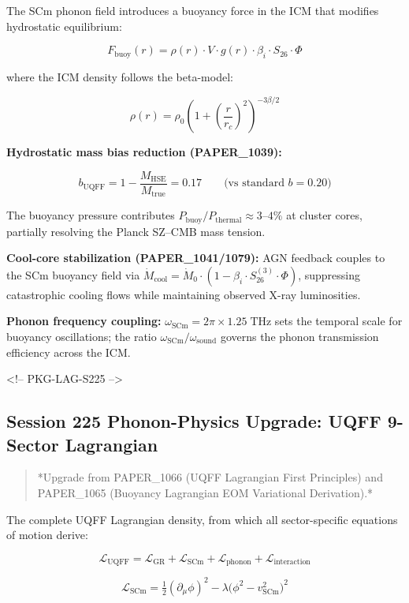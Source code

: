 \documentclass[11pt]{article}
\begin{document}
The SCm phonon field introduces a buoyancy force in the ICM that modifies hydrostatic equilibrium:

$$F_{\text{buoy}}(r) = \rho(r) \cdot V \cdot g(r) \cdot \beta_i \cdot S_{26} \cdot \Phi$$

where the ICM density follows the beta-model:

$$\rho(r) = \rho_0 \left(1 + \left(\frac{r}{r_c}\right)^2\right)^{-3\beta/2}$$

\textbf{Hydrostatic mass bias reduction (PAPER\_1039):}

$$b_{\text{UQFF}} = 1 - \frac{M_{\text{HSE}}}{M_{\text{true}}} = 0.17 \qquad \text{(vs standard } b = 0.20\text{)}$$

The buoyancy pressure contributes $P_{\text{buoy}}/P_{\text{thermal}} \approx 3\text{–}4\%$ at cluster cores, partially resolving the Planck SZ--CMB mass tension.

\textbf{Cool-core stabilization (PAPER\_1041/1079):} AGN feedback couples to the SCm buoyancy field via $\dot{M}_{\text{cool}} = \dot{M}_0 \cdot (1 - \beta_i \cdot S_{26}^{(3)} \cdot \Phi)$, suppressing catastrophic cooling flows while maintaining observed X-ray luminosities.

\textbf{Phonon frequency coupling:} $\omega_{\text{SCm}} = 2\pi \times 1.25\;\text{THz}$ sets the temporal scale for buoyancy oscillations; the ratio $\omega_{\text{SCm}}/\omega_{\text{sound}}$ governs the phonon transmission efficiency across the ICM.

<!-- PKG-LAG-S225 -->

\subsection*{Session 225 Phonon-Physics Upgrade: UQFF 9-Sector Lagrangian}

\begin{quote}
*Upgrade from PAPER\_1066 (UQFF Lagrangian First Principles) and
PAPER\_1065 (Buoyancy Lagrangian EOM Variational Derivation).*
\end{quote}

The complete UQFF Lagrangian density, from which all sector-specific equations of motion derive:

$$\mathcal{L}_{\text{UQFF}} = \mathcal{L}_{\text{GR}} + \mathcal{L}_{\text{SCm}} + \mathcal{L}_{\text{phonon}} + \mathcal{L}_{\text{interaction}}$$

$$\mathcal{L}_{\text{SCm}} = \tfrac{1}{2}(\partial_\mu \phi)^2 - \lambda\bigl(\phi^2 - v_{\text{SCm}}^2\bigr)^2$$
\end{document}
